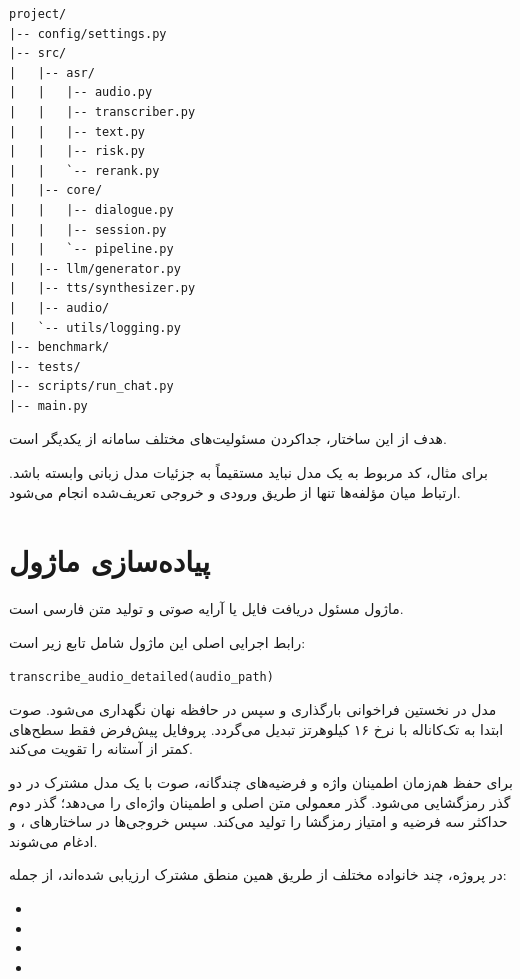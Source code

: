 \begin{latin}\begin{verbatim}
project/
|-- config/settings.py
|-- src/
|   |-- asr/
|   |   |-- audio.py
|   |   |-- transcriber.py
|   |   |-- text.py
|   |   |-- risk.py
|   |   `-- rerank.py
|   |-- core/
|   |   |-- dialogue.py
|   |   |-- session.py
|   |   `-- pipeline.py
|   |-- llm/generator.py
|   |-- tts/synthesizer.py
|   |-- audio/
|   `-- utils/logging.py
|-- benchmark/
|-- tests/
|-- scripts/run_chat.py
|-- main.py
\end{verbatim}\end{latin}

هدف از این ساختار، جداکردن مسئولیت‌های مختلف سامانه از یکدیگر
است.

برای مثال، کد مربوط به یک مدل  نباید مستقیماً به جزئیات
مدل زبانی وابسته باشد.
ارتباط میان مؤلفه‌ها تنها از طریق ورودی و خروجی تعریف‌شده
انجام می‌شود.


\section{پیاده‌سازی ماژول }

ماژول  مسئول دریافت فایل یا آرایه صوتی و تولید متن فارسی
است.

رابط اجرایی اصلی این ماژول شامل تابع زیر است:

\begin{latin}\begin{verbatim}
transcribe_audio_detailed(audio_path)
\end{verbatim}\end{latin}

مدل  در نخستین فراخوانی بارگذاری و سپس در حافظه نهان
نگهداری می‌شود. صوت ابتدا به  تک‌کاناله با نرخ ۱۶
کیلوهرتز تبدیل می‌گردد. پروفایل پیش‌فرض
 فقط سطح‌های کمتر از آستانه را تقویت می‌کند.

برای حفظ هم‌زمان اطمینان واژه و فرضیه‌های چندگانه، صوت با یک
مدل مشترک در دو گذر رمزگشایی می‌شود. گذر معمولی متن اصلی و
اطمینان واژه‌ای را می‌دهد؛ گذر دوم حداکثر سه فرضیه و امتیاز
رمزگشا را تولید می‌کند. سپس خروجی‌ها در ساختارهای
،  و
 ادغام می‌شوند.

در پروژه، چند خانواده مختلف  از طریق همین منطق مشترک
ارزیابی شده‌اند، از جمله:

\begin{itemize}

    \item {}
    \item {}
    \item {}
    \item {}

\end{itemize}

